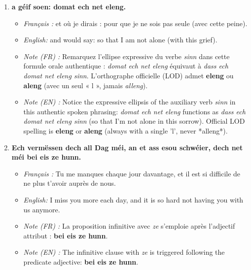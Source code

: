 \begin{enumerate}
    \item \textbf{a géif soen: domat ech net eleng.}
    \begin{itemize}
        \item \textit{Français :} et où je dirais : pour que je ne sois pas seule (avec cette peine).
        \item \textit{English:} and would say: so that I am not alone (with this grief).
        \item \textit{Note (FR) :} Remarquez l'ellipse expressive du verbe \textit{sinn} dans cette formule orale authentique : \textit{domat ech net eleng} équivaut à \textit{dass ech domat net eleng sinn}. L'orthographe officielle (LOD) admet \textbf{eleng} ou \textbf{aleng} (avec un seul « l », jamais \textit{alleng}).
        \item \textit{Note (EN) :} Notice the expressive ellipsis of the auxiliary verb \textit{sinn} in this authentic spoken phrasing: \textit{domat ech net eleng} functions as \textit{dass ech domat net eleng sinn} (so that I'm not alone in this sorrow). Official LOD spelling is \textbf{eleng} or \textbf{aleng} (always with a single 'l', never *alleng*).
    \end{itemize}

    \vspace{0.6em}

    \item \textbf{Ech vermëssen dech all Dag méi, an et ass esou schwéier, dech net méi bei eis ze hunn.}
    \begin{itemize}
        \item \textit{Français :} Tu me manques chaque jour davantage, et il est si difficile de ne plus t'avoir auprès de nous.
        \item \textit{English:} I miss you more each day, and it is so hard not having you with us anymore.
        \item \textit{Note (FR) :} La proposition infinitive avec \textit{ze} s'emploie après l'adjectif attribut : \textbf{bei eis ze hunn}.
        \item \textit{Note (EN) :} The infinitive clause with \textit{ze} is triggered following the predicate adjective: \textbf{bei eis ze hunn}.
    \end{itemize}

    \vspace{0.6em}


\end{enumerate}
